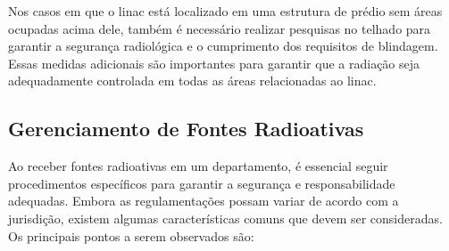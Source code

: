 \documentclass[11pt,a4paper]{article}
\begin{document}
	Nos casos em que o linac está localizado em uma estrutura de prédio sem áreas ocupadas acima dele, também é necessário realizar pesquisas no telhado para garantir a segurança radiológica e o cumprimento dos requisitos de blindagem. Essas medidas adicionais são importantes para garantir que a radiação seja adequadamente controlada em todas as áreas relacionadas ao linac.


\subsection*{Gerenciamento de Fontes Radioativas}

	Ao receber fontes radioativas em um departamento, é essencial seguir procedimentos específicos para garantir a segurança e responsabilidade adequadas. Embora as regulamentações possam variar de acordo com a jurisdição, existem algumas características comuns que devem ser consideradas. Os principais pontos a serem observados são:
\end{document}
